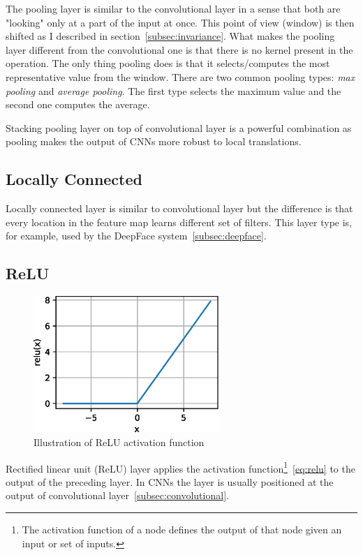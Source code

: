 The pooling layer is similar to the convolutional layer in a sense that both are "looking" only at a part of the input
at once.
This point of view (window) is then shifted as I described in section~\ref{subsec:invariance}.
What makes the pooling layer different from the convolutional one is that there is no kernel present in the operation.
The only thing pooling does is that it selects/computes the most representative value from the window.
There are two common pooling types: \textit{max pooling} and \textit{average pooling}.
The first type selects the maximum value and the second one computes the average.

Stacking pooling layer on top of convolutional layer is a powerful combination as pooling makes the output of CNNs
more robust to local translations\cite{DeepFace}.

\subsection{Locally Connected}\label{subsec:lclayer}
Locally connected layer is similar to convolutional layer but the difference is that every location in the feature map
learns different set of filters.
This layer type is, for example, used by the DeepFace system~\ref{subsec:deepface}.

\subsection{ReLU}\label{subsec:relu}

\begin{figure}
    \label{fig:relu}
    \includegraphics[width=7cm]{images/cnn/relu.eps}
    \caption{Illustration of ReLU activation function~\cite{ReLU}}
\end{figure}

Rectified linear unit (ReLU) layer applies the activation function\footnote{The activation
function of a node defines the output of that node given an input or set of inputs.}~\ref{eq:relu} to the output of
the preceding layer.
In CNNs the layer is usually positioned at the output of convolutional layer~\ref{subsec:convolutional}.

